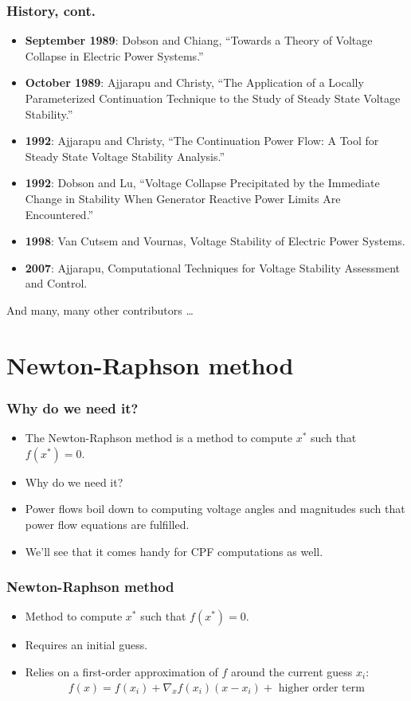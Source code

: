 \documentclass{beamer}
\begin{document}
\begin{frame}
  \frametitle{History, cont.}
  \begin{itemize}
  \item \textbf{September 1989}: Dobson and Chiang, “Towards a Theory of Voltage Collapse in Electric Power Systems.”
  \item \textbf{October 1989}: Ajjarapu and Christy, “The Application of a Locally Parameterized Continuation Technique to the Study of Steady State Voltage Stability.”
  \item \textbf{1992}: Ajjarapu and Christy, “The Continuation Power Flow: A Tool for Steady State Voltage Stability Analysis.”
  \item \textbf{1992}: Dobson and Lu, “Voltage Collapse Precipitated by the Immediate Change in Stability When Generator Reactive Power Limits Are Encountered.”
  \item \textbf{1998}: Van Cutsem and Vournas, Voltage Stability of Electric Power Systems.
  \item \textbf{2007}: Ajjarapu, Computational Techniques for Voltage Stability Assessment and Control.
  \end{itemize}
And many, many other contributors \ldots
\end{frame}

\section[NR method]{Newton-Raphson method}
\label{sec:newt-raphs-meth}

\begin{frame}
  \frametitle{Why do we need it?}
  \begin{itemize}
  \item The Newton-Raphson method is a method to compute $x^{*}$ such that $f(x^{*})=0$.
  \item Why do we need it?
  \item<visible@2-> Power flows boil down to computing voltage angles and magnitudes such that power flow equations are fulfilled.
  \item<visible@3-> We'll see that it comes handy for CPF computations as well.
  \end{itemize}
\end{frame}

\begin{frame}
  \frametitle{Newton-Raphson method}
  \begin{itemize}
  \item Method to compute $x^{*}$ such that $f(x^{*}) = 0$.
  \item Requires an initial guess.
  \item Relies on a first-order approximation of $f$ around the current guess $x_i$:
    \begin{align}
      f(x) = f(x_i) + \nabla_x f(x_i) (x-x_i) + \text{ higher order term}
    \end{align}
  \end{itemize}
\end{frame}
\end{document}
